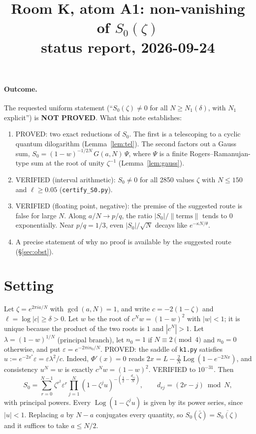 \documentclass[11pt]{article}
\title{Room K, atom A1: non-vanishing of $S_0(\zeta)$\\ \small status report, 2026-09-24}
\date{}
\theoremstyle{remark}\newtheorem{remark}[lemma]{Remark}
\begin{document}
\maketitle

\paragraph{Outcome.}
The requested uniform statement (``$S_0(\zeta)\ne0$ for all $N\ge N_1(\delta)$, with $N_1$ explicit'') is \textbf{NOT PROVED}.
What this note establishes:
\begin{enumerate}
\item[(i)] PROVED: two exact reductions of $S_0$. The first is a telescoping to a cyclic quantum dilogarithm (Lemma~\ref{lem:tel}). The second factors out a Gauss sum, $S_0=(1-w)^{-1/2N}\,G(a,N)\,\Psi$, where $\Psi$ is a finite Rogers--Ramanujan-type sum at the root of unity $\zeta^{-1}$ (Lemma~\ref{lem:gauss}).
\item[(ii)] VERIFIED (interval arithmetic): $S_0\ne0$ for all 2850 values $\zeta$ with $N\le150$ and $\ell\ge0.05$ (\texttt{certify\_S0.py}).
\item[(iii)] VERIFIED (floating point, negative): the premise of the suggested route is false for large $N$. Along $a/N\to p/q$, the ratio $|S_0|/\|\text{terms}\|$ tends to $0$ exponentially. Near $p/q=1/3$, even $|S_0|/\sqrt N$ decays like $e^{-\kappa N/\theta}$.
\item[(iv)] A precise statement of why no proof is available by the suggested route (\S\ref{sec:obst}).
\end{enumerate}

\section{Setting}
Let $\zeta=e^{2\pi i a/N}$ with $\gcd(a,N)=1$, and write $c=-2(1-\zeta)$ and $\ell=\log|c|\ge\delta>0$.
Let $w$ be the root of $c^Nw=(1-w)^2$ with $|w|<1$; it is unique because the product of the two roots is $1$ and $|c^N|>1$.
Let $\lambda=(1-w)^{1/N}$ (principal branch), let $n_0=1$ if $N\equiv2\pmod 4$ and $n_0=0$ otherwise, and put $\varepsilon=e^{-2\pi i n_0/N}$.
PROVED: the saddle of \texttt{k1.py} satisfies $u:=e^{-2x^*}\varepsilon=\varepsilon\lambda^2/c$. Indeed, $\Phi'(x)=0$ reads $2x=L-\tfrac2N\operatorname{Log}(1-e^{-2Nx})$, and consistency $u^N=w$ is exactly $c^Nw=(1-w)^2$. VERIFIED to $10^{-31}$.
Then
\[S_0=\sum_{r=0}^{N-1}\zeta^{r^2}\varepsilon^{r}\prod_{j=1}^{N}(1-\zeta^ju)^{-(\frac12-\frac{d_{rj}}N)},\qquad d_{rj}=(2r-j)\bmod N,\]
with principal powers. Every $\operatorname{Log}(1-\zeta^ju)$ is given by its power series, since $|u|<1$.
Replacing $a$ by $N-a$ conjugates every quantity, so $S_0(\bar\zeta)=\overline{S_0(\zeta)}$ and it suffices to take $a\le N/2$.
\end{document}
